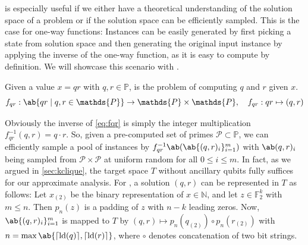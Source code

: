  is especially useful if we either have a theoretical understanding of the solution space of a problem or if the solution space can be efficiently sampled. This is the case for one-way functions: Instances can be easily generated by first picking a state from solution space and then generating the original input instance by applying the inverse of the one-way function, as it is easy to compute by definition. We will showcase this scenario with \qrfactoring.
\begin{definition}
    Given a value $x = qr$ with $q, r \in \mathds{P}$, \qrfactoring is the problem of computing $q$ and $r$ given $x$.
    \begin{equation}
        \label{eq:fqr}
        f_{qr} : \ab\{qr \mid q, r \in \mathds{P}\} \to \mathds{P} \times \mathds{P} ,\quad f_{qr} : qr \mapsto (q,r)
    \end{equation}
\end{definition}
Obviously the inverse of \cref{eq:fqr} is simply the integer multiplication $f_{qr}^{-1}(q,r) = q \cdot r$. So, given a pre-computed set of primes $\mathcal{P} \subset \mathds{P}$, we can efficiently sample a pool of \qrfactoring instances by $f_{qr}^{-1} \ab(\ab\{(q,r)_i\}_{i=1}^m)$ with $\ab(q,r)_i$ being sampled from $\mathcal{P} \times \mathcal{P}$ at uniform random for all $0 \leq i \leq m$. In fact, as we argued in \cref{sec:kclique}, the target space $T$ without ancillary qubits fully suffices for our approximate analysis. For \qrfactoring, a solution $(q,r)$ can be represented in $T$ as follows: Let $x_{(2)}$ be the binary representation of $x \in \mathds{N}$, and let $z \in \mathds{F}_2^{k}$ with $m \leq n$. Then $p_n(z)$ is a padding of $z$ with $n - k$ leading zeros. Now, $\ab\{(q,r)_i\}_{i = 1}^m$ is mapped to $T$ by $(q,r) \mapsto p_n(q_{(2)}) \circ p_n(r_{(2)})$ with $n = \max\ab\{\lceil \lb(q) \rceil, \lceil \lb(r) \rceil\}$, where $\circ$ denotes concatenation of two bit strings.

